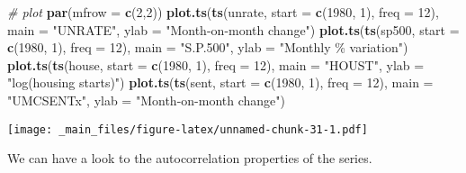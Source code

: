 \documentclass[
]{book}
\newenvironment{Shaded}{\begin{snugshade}}{\end{snugshade}}
\newcommand{\AttributeTok}[1]{\textcolor[rgb]{0.13,0.29,0.53}{#1}}
\newcommand{\CommentTok}[1]{\textcolor[rgb]{0.56,0.35,0.01}{\textit{#1}}}
\newcommand{\DecValTok}[1]{\textcolor[rgb]{0.00,0.00,0.81}{#1}}
\newcommand{\FunctionTok}[1]{\textcolor[rgb]{0.13,0.29,0.53}{\textbf{#1}}}
\newcommand{\NormalTok}[1]{#1}
\newcommand{\StringTok}[1]{\textcolor[rgb]{0.31,0.60,0.02}{#1}}
\begin{document}
\begin{Shaded}
\begin{Highlighting}[]
\CommentTok{\# plot}
\FunctionTok{par}\NormalTok{(}\AttributeTok{mfrow =} \FunctionTok{c}\NormalTok{(}\DecValTok{2}\NormalTok{,}\DecValTok{2}\NormalTok{))}
\FunctionTok{plot.ts}\NormalTok{(}\FunctionTok{ts}\NormalTok{(unrate, }\AttributeTok{start =} \FunctionTok{c}\NormalTok{(}\DecValTok{1980}\NormalTok{, }\DecValTok{1}\NormalTok{), }\AttributeTok{freq =} \DecValTok{12}\NormalTok{), }\AttributeTok{main =} \StringTok{"UNRATE"}\NormalTok{, }\AttributeTok{ylab =} \StringTok{"Month{-}on{-}month change"}\NormalTok{)}
\FunctionTok{plot.ts}\NormalTok{(}\FunctionTok{ts}\NormalTok{(sp500, }\AttributeTok{start =} \FunctionTok{c}\NormalTok{(}\DecValTok{1980}\NormalTok{, }\DecValTok{1}\NormalTok{), }\AttributeTok{freq =} \DecValTok{12}\NormalTok{), }\AttributeTok{main =} \StringTok{"S.P.500"}\NormalTok{, }\AttributeTok{ylab =} \StringTok{"Monthly \% variation"}\NormalTok{)}
\FunctionTok{plot.ts}\NormalTok{(}\FunctionTok{ts}\NormalTok{(house, }\AttributeTok{start =} \FunctionTok{c}\NormalTok{(}\DecValTok{1980}\NormalTok{, }\DecValTok{1}\NormalTok{), }\AttributeTok{freq =} \DecValTok{12}\NormalTok{), }\AttributeTok{main =} \StringTok{"HOUST"}\NormalTok{, }\AttributeTok{ylab =} \StringTok{"log(housing starts)"}\NormalTok{)}
\FunctionTok{plot.ts}\NormalTok{(}\FunctionTok{ts}\NormalTok{(sent, }\AttributeTok{start =} \FunctionTok{c}\NormalTok{(}\DecValTok{1980}\NormalTok{, }\DecValTok{1}\NormalTok{), }\AttributeTok{freq =} \DecValTok{12}\NormalTok{), }\AttributeTok{main =} \StringTok{"UMCSENTx"}\NormalTok{, }\AttributeTok{ylab =} \StringTok{"Month{-}on{-}month change"}\NormalTok{)}
\end{Highlighting}
\end{Shaded}

\texttt{[image: \_main\_files/figure-latex/unnamed-chunk-31-1.pdf]}

We can have a look to the autocorrelation properties of the series.
\end{document}
